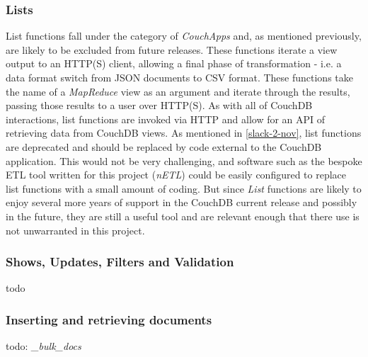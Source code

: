 \subsubsection{Lists}
List functions fall under the category of \textit{CouchApps} and, as mentioned previously, are likely to be excluded from future releases. These functions iterate a view output to an HTTP(S) client, allowing a final phase of transformation - i.e. a data format switch from JSON documents to CSV format. These  functions take the name of a \textit{MapReduce} view as an argument and iterate through the results, passing those results to a user over HTTP(S). As with all of CouchDB interactions, list functions are invoked via HTTP and allow for an API of retrieving data from CouchDB views. As mentioned in \ref{slack-2-nov}, list functions are deprecated and should be replaced by code external to the CouchDB application. This would not be very challenging, and software such as the bespoke ETL tool written for this project (\textit{nETL}) could be easily configured to replace list functions with a small amount of coding. But since \textit{List} functions are likely to enjoy several more years of support in the CouchDB current release and possibly in the future, they are still a useful tool and are relevant enough that there use is not unwarranted in this project.

\subsubsection{Shows, Updates, Filters and Validation}
todo

\subsubsection{Inserting and retrieving documents}

todo:
\textit{\_bulk\_docs}